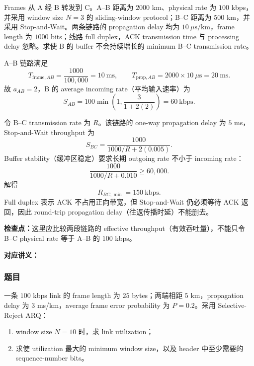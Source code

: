 Frames 从 A 经 B 转发到 C。A--B 距离为 $2000$ km、physical rate 为 $100$ kbps，并采用 window size $N=3$ 的 sliding-window protocol；B--C 距离为 $500$ km，并采用 Stop-and-Wait。两条链路的 propagation delay 均为 $10\ \mu\mathrm{s/km}$，frame length 为 $1000$ bits；线路 full duplex，ACK transmission time 与 processing delay 忽略。求使 B 的 buffer 不会持续增长的 minimum B--C transmission rate。

\begin{checkedsolution}
A--B 链路满足
\[
  T_{\mathrm{frame},AB}=\frac{1000}{100{,}000}=10\ \mathrm{ms},
  \qquad
  T_{\mathrm{prop},AB}=2000\times10\ \mu\mathrm{s}=20\ \mathrm{ms}.
\]
故 $a_{AB}=2$，B 的 average incoming rate（平均输入速率）为
\[
  S_{AB}=100\min\!\left(1,\frac{3}{1+2(2)}\right)
  =\boxed{60\ \mathrm{kbps}}.
\]

令 B--C transmission rate 为 $R$。该链路的 one-way propagation delay 为 $5$ ms，Stop-and-Wait throughput 为
\[
  S_{BC}
  =\frac{1000}{1000/R+2(0.005)}.
\]
Buffer stability（缓冲区稳定）要求长期 outgoing rate 不小于 incoming rate：
\[
  \frac{1000}{1000/R+0.010}\ge60{,}000.
\]
解得
\[
  \boxed{R_{BC,\min}=150\ \mathrm{kbps}}.
\]
Full duplex 表示 ACK 不占用正向带宽，但 Stop-and-Wait 仍必须等待 ACK 返回，因此 round-trip propagation delay（往返传播时延）不能删去。
\end{checkedsolution}

\textbf{检查点：}这里应比较两段链路的 effective throughput（有效吞吐量），不能只令 B--C physical rate 等于 A--B 的 $100$ kbps。


\textbf{对应讲义：}

\subsubsection*{题目}

一条 $100$ kbps link 的 frame length 为 $25$ bytes；两端相距 $5$ km，propagation delay 为 $3$ ms/km，average frame error probability 为 $P=0.2$。采用 Selective-Reject ARQ：
\begin{enumerate}[label=(\alph*)]
  \item window size $N=10$ 时，求 link utilization；
  \item 求使 utilization 最大的 minimum window size，以及 header 中至少需要的 sequence-number bits。
\end{enumerate}

